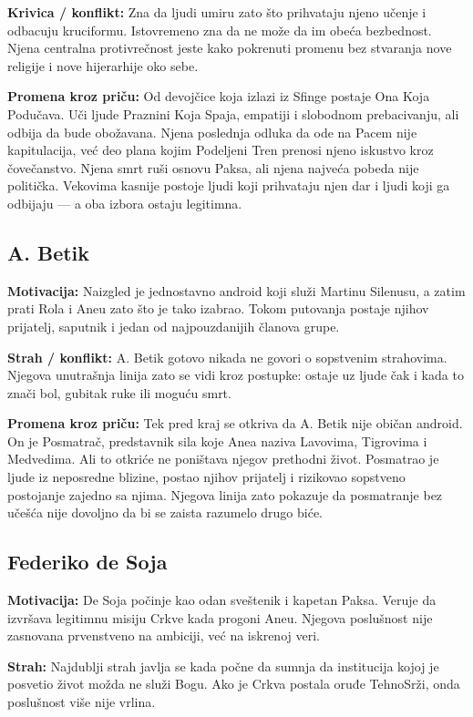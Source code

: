 \textbf{Krivica / konflikt:} Zna da ljudi umiru zato što prihvataju njeno učenje i odbacuju kruciformu. Istovremeno zna da ne može da im obeća bezbednost. Njena centralna protivrečnost jeste kako pokrenuti promenu bez stvaranja nove religije i nove hijerarhije oko sebe.

\textbf{Promena kroz priču:} Od devojčice koja izlazi iz Sfinge postaje Ona Koja Podučava. Uči ljude Praznini Koja Spaja, empatiji i slobodnom prebacivanju, ali odbija da bude obožavana. Njena poslednja odluka da ode na Pacem nije kapitulacija, već deo plana kojim Podeljeni Tren prenosi njeno iskustvo kroz čovečanstvo. Njena smrt ruši osnovu Paksa, ali njena najveća pobeda nije politička. Vekovima kasnije postoje ljudi koji prihvataju njen dar i ljudi koji ga odbijaju --- a oba izbora ostaju legitimna.


\subsection*{A. Betik}

\textbf{Motivacija:} Naizgled je jednostavno android koji služi Martinu Silenusu, a zatim prati Rola i Aneu zato što je tako izabrao. Tokom putovanja postaje njihov prijatelj, saputnik i jedan od najpouzdanijih članova grupe.

\textbf{Strah / konflikt:} A. Betik gotovo nikada ne govori o sopstvenim strahovima. Njegova unutrašnja linija zato se vidi kroz postupke: ostaje uz ljude čak i kada to znači bol, gubitak ruke ili moguću smrt.

\textbf{Promena kroz priču:} Tek pred kraj se otkriva da A. Betik nije običan android. On je Posmatrač, predstavnik sila koje Anea naziva Lavovima, Tigrovima i Medvedima. Ali to otkriće ne poništava njegov prethodni život. Posmatrao je ljude iz neposredne blizine, postao njihov prijatelj i rizikovao sopstveno postojanje zajedno sa njima. Njegova linija zato pokazuje da posmatranje bez učešća nije dovoljno da bi se zaista razumelo drugo biće.


\subsection*{Federiko de Soja}

\textbf{Motivacija:} De Soja počinje kao odan sveštenik i kapetan Paksa. Veruje da izvršava legitimnu misiju Crkve kada progoni Aneu. Njegova poslušnost nije zasnovana prvenstveno na ambiciji, već na iskrenoj veri.

\textbf{Strah:} Najdublji strah javlja se kada počne da sumnja da institucija kojoj je posvetio život možda ne služi Bogu. Ako je Crkva postala oruđe TehnoSrži, onda poslušnost više nije vrlina.

